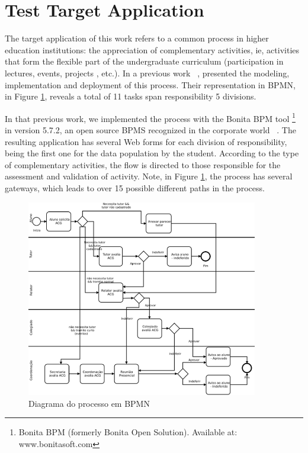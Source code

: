 \documentclass[runningheads,a4paper]{llncs}
\begin{document}
\section{Test Target Application}\label{s:apli}


The target application of this work refers to a common process in higher education institutions: the appreciation of complementary activities, ie, activities that form the flexible part of the undergraduate curriculum (participation in lectures, events, projects , etc.). In a previous work ~\cite{sbsi2013}, presented the modeling, implementation and deployment of this process. Their representation in BPMN, in Figure \ref{fig:diagrama}, reveals a total of 11 tasks span responsibility 5 divisions.

In that previous work, we implemented the process with the Bonita BPM tool \footnote{Bonita BPM (formerly Bonita Open Solution). Available at: www.bonitasoft.com} in version 5.7.2, an open source BPMS recognized in the corporate world ~\cite{forrester}. The resulting application has several Web forms for each division of responsibility, being the first one for the data population by the student. According to the type of complementary activities, the flow is directed to those responsible for the assessment and validation of activity. Note, in Figure \ref{fig:diagrama}, the process has several gateways, which leads to over 15 possible different paths in the process.

\begin{figure}[ht]
\centering
\includegraphics[width=0.9\textwidth]{figuras/processo.png}
\caption{Diagrama do processo em BPMN}
\label{fig:diagrama}
\end{figure}
\end{document}
